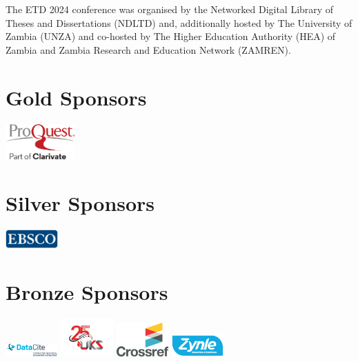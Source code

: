 \begin{center}
The ETD 2024 conference was organised by the Networked Digital Library of Theses and Dissertations (NDLTD) and, additionally hosted by The University of Zambia (UNZA) and co-hosted by The Higher Education Authority (HEA) of Zambia and Zambia Research and Education Network (ZAMREN).
\end{center}


\section{Gold Sponsors}

\begin{center}
\includegraphics[width=0.20\textwidth]{images/logos/Partnerlogos/img-etd24-artwork-sponsors-proquest.png}
\end{center}

\section{Silver Sponsors}

\begin{center}
\includegraphics[width=0.15\textwidth]{images/logos/Partnerlogos/img-etd24-artwork-sponsors-ebsco.png}
\end{center}

\section{Bronze Sponsors}

\begin{center}
\includegraphics[width=0.15\textwidth]{images/logos/Partnerlogos/img-etd24-artwork-sponsors-datacite.png}
\includegraphics[width=0.15\textwidth]{images/logos/Partnerlogos/img-etd24-artwork-sponsors-uks.png}
\includegraphics[width=0.15\textwidth]{images/logos/Partnerlogos/img-etd24-artwork-sponsors-crossref.jpg}
\includegraphics[width=0.15\textwidth]{images/logos/Partnerlogos/img-etd24-artwork-sponsors-zynle.png}
\end{center}

